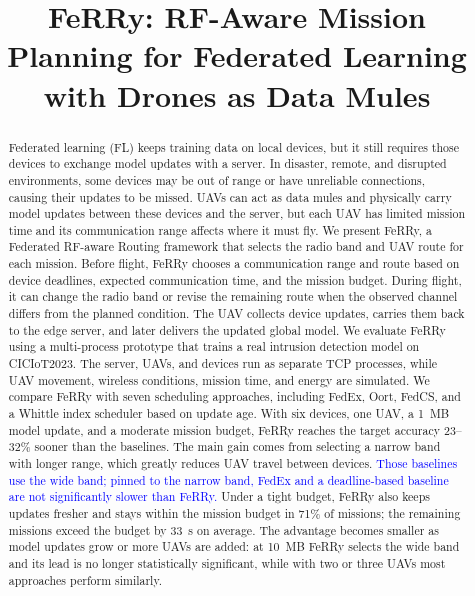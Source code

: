 \documentclass[conference]{IEEEtran}
\begin{document}
\title{FeRRy: RF-Aware Mission Planning for Federated Learning with Drones as Data Mules}

\maketitle

\begin{abstract}
Federated learning (FL) keeps training data on local devices, but it still
requires those devices to exchange model updates with a server. In disaster,
remote, and disrupted environments, some devices may be out of range or have
unreliable connections, causing their updates to be missed. UAVs can act as data
mules and physically carry model updates between these devices and the server,
but each UAV has limited mission time and its communication range affects where
it must fly. We present FeRRy, a Federated RF-aware Routing framework that selects the radio
band and UAV route for each mission. Before flight, FeRRy chooses a communication
range and route based on device deadlines, expected communication time, and the
mission budget. During flight, it can change the radio band or revise the
remaining route when the observed channel differs from the planned condition.
The UAV collects device updates, carries them back to the edge server, and later
delivers the updated global model. We evaluate FeRRy using a multi-process prototype that trains a real intrusion
detection model on CICIoT2023. The server, UAVs, and devices run as separate TCP
processes, while UAV movement, wireless conditions, mission time, and energy are
simulated. We compare FeRRy with seven scheduling approaches, including FedEx,
Oort, FedCS, and a Whittle index scheduler based on update age. With six devices,
one UAV, a 1~MB model update, and a moderate mission budget, FeRRy reaches the
target accuracy 23--32\% sooner than the baselines. The main gain comes from
selecting a narrow band with longer range, which greatly reduces UAV travel
between devices. \textcolor{blue}{Those baselines use the wide band; pinned to the narrow band, FedEx and a
deadline-based baseline are not significantly slower than FeRRy.} Under a tight budget, FeRRy also keeps updates fresher and stays
within the mission budget in 71\% of missions; the remaining missions exceed the
budget by 33~s on average. The advantage becomes smaller as model updates grow or
more UAVs are added: at 10~MB FeRRy selects the wide band and its lead is no
longer statistically significant, while with two or three UAVs most approaches
perform similarly.
\end{abstract}
\end{document}
